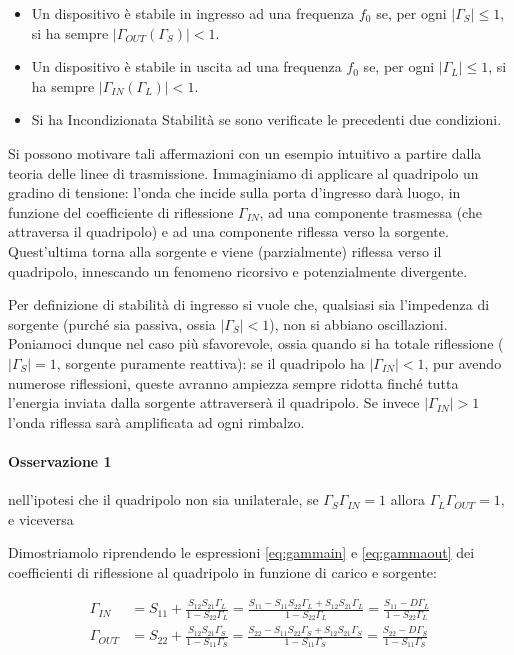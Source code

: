 \begin{itemize}
	\item Un dispositivo è stabile in ingresso ad una frequenza $f_0$ se, per ogni $|\Gamma_S| \leq 1$, si ha sempre $|\Gamma_{OUT}(\Gamma_S)| < 1$.
	
	\item Un dispositivo è stabile in uscita ad una frequenza $f_0$ se, per ogni $|\Gamma_L| \leq 1$, si ha sempre $|\Gamma_{IN}(\Gamma_L)| < 1$.
	
	\item Si ha Incondizionata Stabilità se sono verificate le precedenti due condizioni.
\end{itemize}

Si possono motivare tali affermazioni con un esempio intuitivo a partire dalla teoria delle linee di trasmissione. Immaginiamo di applicare al quadripolo un gradino di tensione: l'onda che incide sulla porta d'ingresso darà luogo, in funzione del coefficiente di riflessione $\Gamma_{IN}$, ad una componente trasmessa (che attraversa il quadripolo) e ad una componente riflessa verso la sorgente. Quest'ultima torna alla sorgente e viene (parzialmente) riflessa verso il quadripolo, innescando un fenomeno ricorsivo e potenzialmente divergente.

Per definizione di stabilità di ingresso si vuole che, qualsiasi sia l'impedenza di sorgente (purché sia passiva, ossia $|\Gamma_S|<1$), non si abbiano oscillazioni. Poniamoci dunque nel caso più sfavorevole, ossia quando si ha totale riflessione ($|\Gamma_S| = 1$, sorgente puramente reattiva): se il quadripolo ha $|\Gamma_{IN}|<1$, pur avendo numerose riflessioni, queste avranno ampiezza sempre ridotta finché tutta l'energia inviata dalla sorgente attraverserà il quadripolo.
Se invece $|\Gamma_{IN}|>1$ l'onda riflessa sarà amplificata ad ogni rimbalzo.

\paragraph{Osservazione 1}
nell'ipotesi che il quadripolo non sia unilaterale, se $\Gamma_S \Gamma_{IN} = 1$ allora $\Gamma_L \Gamma_{OUT}=1$, e viceversa

Dimostriamolo riprendendo le espressioni \ref{eq:gammain} e \ref{eq:gammaout} dei coefficienti di riflessione al quadripolo in funzione di carico e sorgente:

\begin{align*}
\Gamma_{IN} &= S_{11} + \frac{S_{12} S_{21} \Gamma_L}{1-S_{22}\Gamma_L}=
\frac{S_{11}-S_{11}S_{22}\Gamma_L+S_{12}S_{21}\Gamma_L}{1-S_{22}\Gamma_L} =
\frac{S_{11} - D\Gamma_L}{1-S_{22}\Gamma_L}
\\
\Gamma_{OUT} &= S_{22} + \frac{S_{12} S_{21} \Gamma_S}{1-S_{11}\Gamma_S}=
\frac{S_{22}-S_{11}S_{22}\Gamma_S+S_{12}S_{21}\Gamma_S}{1-S_{11}\Gamma_S} =
\frac{S_{22} - D\Gamma_S}{1-S_{11}\Gamma_S}
\end{align*}


